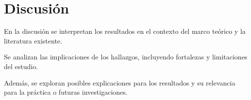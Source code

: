 \section{Discusión}
\label{sec:discusion}

En la discusión se interpretan los resultados en el contexto del marco teórico y la literatura existente.

Se analizan las implicaciones de los hallazgos, incluyendo fortalezas y limitaciones del estudio.

Además, se exploran posibles explicaciones para los resultados y su relevancia para la práctica o futuras investigaciones.